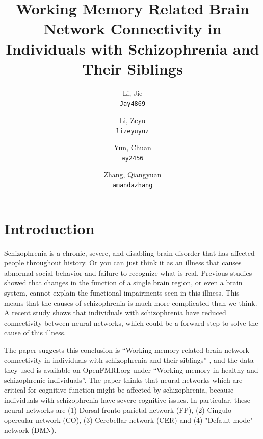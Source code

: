 \documentclass[11pt]{article}
\title{Working Memory Related Brain Network Connectivity in Individuals with Schizophrenia and Their Siblings}
\author{
  Li, Jie\\
  \texttt{Jay4869}
  \and
  Li, Zeyu\\
  \texttt{lizeyuyuz}
  \and
  Yun, Chuan\\
  \texttt{ay2456}
  \and
  Zhang, Qiangyuan\\
  \texttt{amandazhang}
}
\begin{document}
\maketitle


\section{Introduction}

Schizophrenia is a chronic, severe, and disabling brain disorder that has 
affected people throughout history. Or you can just think it as an illness that
causes abnormal social behavior and failure to recognize what is real. Previous 
studies showed that changes in the function of a single brain region, or even a 
brain system, cannot explain the functional impairments seen in this illness. 
This means that the causes of schizophrenia is much more complicated than we 
think. A recent study shows that individuals with schizophrenia have reduced 
connectivity between neural networks, which could be a forward step to solve 
the cause of this illness.

The paper suggests this conclusion is ``Working memory related brain network 
connectivity in individuals with schizophrenia and their siblings'' 
\cite{schizophreniabrainconnectivity}, and the data they used is available on 
OpenFMRI.org under ``Working memory in healthy and schizophrenic individuals''. 
The paper thinks that neural networks which are critical for cognitive function
might be affected by schizophrenia, because individuals with schizophrenia have 
severe cognitive issues. In particular, these neural networks are (1) Dorsal 
fronto-parietal network (FP), (2) Cingulo-opercular network (CO), (3) 
Cerebellar network (CER) and (4) "Default mode" network (DMN). 


\end{document}
